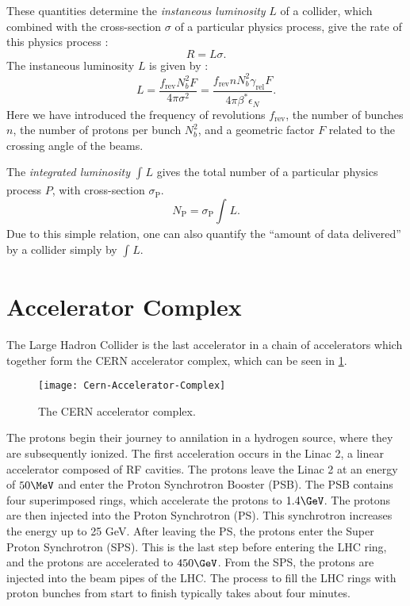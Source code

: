 These quantities determine the \textit{instaneous luminosity} $L$ of a collider, which combined with the cross-section $\sigma$ of a particular physics process, give the rate of this physics process :
\begin{equation} \label{eq:rate}
R = L \sigma.
\end{equation}
The instaneous luminosity $L$ is given by :
\begin{equation}\label{eq:insta_lumi}
L = \frac{f_{\text{rev}} N_b^2 F}{4 \pi \sigma^2}= \frac{f_{\text{rev}} n N_b^2 \gamma_{\text{rel}} F }{ 4\pi \beta^* \epsilon_N}.
\end{equation}
Here we have introduced the frequency of revolutions $f_{\text{rev}}$, the number of bunches $n$, the number of protons per bunch $N_b^2$, and a geometric factor $F$ related to the crossing angle of the beams.

The \textit{integrated luminosity} $\int_{}^{} L$ gives the total number of a particular physics process $P$, with cross-section $\sigma_{\text{P}}$.
\begin{equation}
N_{\text{P}} = \sigma_{\text{P}} \int_{}^{} L.
\end{equation}
Due to this simple relation, one can also quantify the ``amount of data delivered'' by a collider simply by $\int_{}^{} L$.

\section{Accelerator Complex}

The Large Hadron Collider is the last accelerator in a chain of accelerators which together form the CERN accelerator complex, which can be seen in \ref{fig:accelerator_complex}.
\begin{figure}
\caption{The CERN accelerator complex.}\label{fig:accelerator_complex}
\texttt{[image: Cern-Accelerator-Complex]}
\end{figure}
The protons begin their journey to annilation in a hydrogen source, where they are subsequently ionized.
The first acceleration occurs in the Linac 2, a linear accelerator composed of RF cavities.
The protons leave the Linac 2 at an energy of $50 \MeV$ and enter the Proton Synchrotron Booster (PSB).
The PSB contains four superimposed rings, which accelerate the protons to $1.4 \GeV$.
The protons are then injected into the Proton Synchrotron (PS).
This synchrotron increases the energy up to 25 GeV.
After leaving the PS, the protons enter the Super Proton Synchrotron (SPS).
This is the last step before entering the LHC ring, and the protons are accelerated to $450 \GeV$.
From the SPS, the protons are injected into the beam pipes of the LHC.
The process to fill the LHC rings with proton bunches from start to finish typically takes about four minutes.

